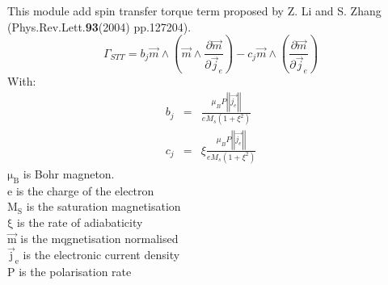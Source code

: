 This module add spin transfer torque term proposed by Z. Li and S. Zhang
(Phys.Rev.Lett.\textbf{93}(2004) pp.127204).
\begin{equation}
	\Gamma_{STT} =
	b_j\overrightarrow{m}\wedge\left(\overrightarrow{m}\wedge\frac{\partial\overrightarrow{m}}{\partial\overrightarrow{j}_e}\right)
	- c_j\overrightarrow{m}\wedge\left(\frac{\partial\overrightarrow{m}}{\partial\overrightarrow{j}_e}\right)
\end{equation}
With:
\begin{eqnarray}
	b_j&=&\frac{\mu_BP\left|\left|\overrightarrow{j_e}\right|\right|}{eM_s\left(1+\xi^2\right)}\\
	c_j&=&\xi\frac{\mu_BP\left|\left|\overrightarrow{j_e}\right|\right|}{eM_s\left(1+\xi^2\right)}
\end{eqnarray}
$\mathrm{\mu_B}$ is Bohr magneton.\\
e is the charge of the electron\\
$\mathrm{M_S}$ is the saturation magnetisation\\
$\mathrm{\xi}$ is the rate of adiabaticity\\
$\mathrm{\overrightarrow{m}}$ is the mqgnetisation normalised\\
$\mathrm{\overrightarrow{j}_e}$ is the electronic current density\\
P is the polarisation rate\\